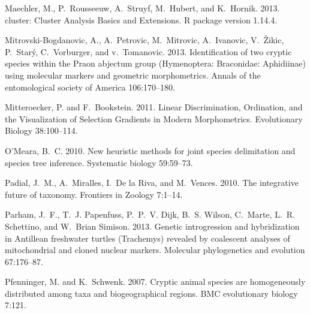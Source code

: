 \documentclass[12pt,letterpaper]{article}
\begin{document}
\begin{thebibliography}{77}
    Maechler, M., P.~Rousseeuw, A.~Struyf, M.~Hubert, and K.~Hornik. 2013. cluster:
    Cluster Analysis Basics and Extensions. R package version 1.14.4.

    Mitrovski-Bogdanovic, A., A.~Petrovic, M.~Mitrovic, A.~Ivanovic, V.~\v{Z}ikic,
    P.~Star\'{y}, C.~Vorburger, and v.~Tomanovic. 2013. {Identification of two
      cryptic species within the Praon abjectum group (Hymenoptera: Braconidae:
    Aphidiinae) using molecular markers and geometric morphometrics}. Annals of
    the entomological society of America 106:170--180.

    Mitteroecker, P. and F.~Bookstein. 2011. {Linear Discrimination, Ordination,
    and the Visualization of Selection Gradients in Modern Morphometrics}.
    Evolutionary Biology 38:100--114.

    O'Meara, B.~C. 2010. {New heuristic methods for joint species delimitation and
    species tree inference.} Systematic biology 59:59--73.

    Padial, J.~M., A.~Miralles, I.~{De la Riva}, and M.~Vences. 2010. {The
    integrative future of taxonomy}. Frontiers in Zoology 7:1--14.

    Parham, J.~F., T.~J. Papenfuss, P.~P.~V. Dijk, B.~S. Wilson, C.~Marte, L.~R.
    Schettino, and W.~{Brian Simison}. 2013. {Genetic introgression and
      hybridization in Antillean freshwater turtles (Trachemys) revealed by
    coalescent analyses of mitochondrial and cloned nuclear markers.} Molecular
    phylogenetics and evolution 67:176--87.

    Pfenninger, M. and K.~Schwenk. 2007. {Cryptic animal species are homogeneously
    distributed among taxa and biogeographical regions.} BMC evolutionary biology
    7:121.


\end{thebibliography}
\end{document}
